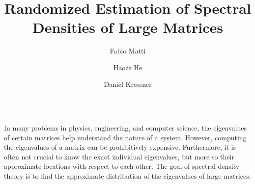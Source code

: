 \documentclass[final, 12pt]{beamer}
\title{Randomized Estimation of Spectral Densities of Large Matrices}
\author{Fabio Matti \and Haoze He \and Daniel Kressner}
\institute[shortinst]{ANCHP, École polytechnique fédérale de Lausanne (EPFL), Lausanne, Switzerland}
\begin{document}

\begin{frame}[t]
\vspace{-20pt}
\begin{columns}[t]
\begin{column}{0.85\paperwidth}
\vspace{-35pt}
    \justify
    In many problems in physics, engineering, and computer science, 
    the eigenvalues of certain matrices help understand the nature of a system.
    However, computing the eigenvalues of a matrix can be prohibitively expensive.
    Furthermore, it is often not crucial to know the exact individual eigenvalues,
    but more so their approximate locations with respect to each other.
    The goal of spectral density theory is to find the approximate distribution of
    the eigenvalues of large matrices.
\vspace{20pt}
\end{column}
\end{columns}


\begin{columns}[t]

    \begin{column}{0.45\paperwidth}


\end{column}
\end{columns}
\end{frame}
\end{document}
